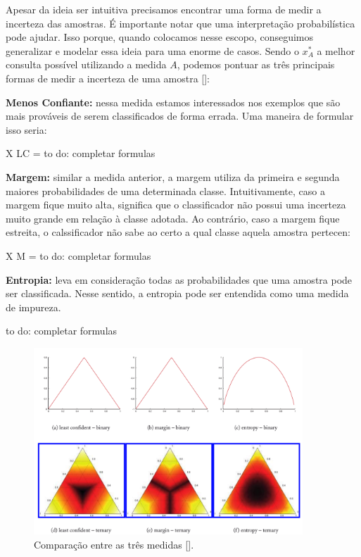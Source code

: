 Apesar da ideia ser intuitiva precisamos encontrar uma forma de medir a incerteza das amostras. É importante notar que uma interpretação probabilística pode ajudar. Isso porque, quando colocamos nesse escopo, conseguimos generalizar e modelar essa ideia para uma enorme de casos. Sendo o $x^*_{A}$ a melhor consulta possível utilizando a medida $A$, podemos pontuar as três principais formas de medir a incerteza de uma amostra [\cite{settles2014active}]:

\textbf{Menos Confiante:} nessa medida estamos interessados nos exemplos que são mais prováveis de serem classificados de forma errada. Uma maneira de formular isso seria:

X {LC} =  to do: completar formulas

\textbf{Margem:} similar a medida anterior, a margem utiliza da primeira e segunda maiores probabilidades de uma determinada classe. Intuitivamente, caso a margem fique muito alta, significa que o classificador não possui uma incerteza muito grande em relação à classe adotada. Ao contrário, caso a margem fique estreita, o calssificador não sabe ao certo a qual classe aquela amostra pertecen:

X M = to do: completar formulas

\textbf{Entropia:} leva em consideração todas as probabilidades que uma amostra pode ser classificada. Nesse sentido, a entropia pode ser entendida como uma medida de impureza. 

to do: completar formulas

\begin{figure}
  \centering
  \includegraphics[width=0.9\textwidth]{figures/settles_2014_uncertainty_medidas.png}
  \caption{Comparação entre as três medidas [\cite{settles2014active}].}
  \label{fig:settles_2014_uncertainty_medidas}
\end{figure}



